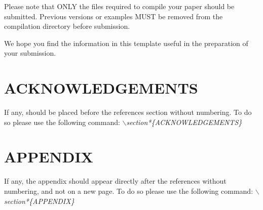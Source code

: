 \documentclass[a4paper,twoside]{article}
\begin{document}
\noindent Please note that ONLY the files required to compile your paper should be submitted. Previous versions or examples MUST be removed from the compilation directory before submission.

We hope you find the information in this template useful in the preparation of your submission.

\section*{\uppercase{Acknowledgements}}

\noindent If any, should be placed before the references section
without numbering. To do so please use the following command:
\textit{$\backslash$section*\{ACKNOWLEDGEMENTS\}}


\vfill

{\small
}


\section*{\uppercase{Appendix}}

\noindent If any, the appendix should appear directly after the
references without numbering, and not on a new page. To do so please use the following command:
\textit{$\backslash$section*\{APPENDIX\}}

\vfill
\end{document}
